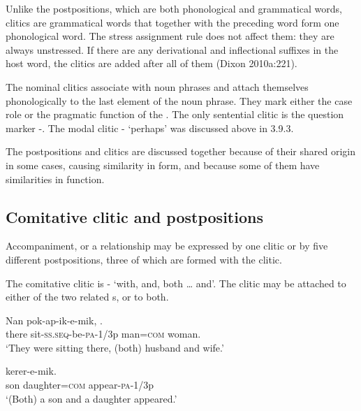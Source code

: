 Unlike the postpositions, which are both phonological and grammatical words, clitics are grammatical words that together with the preceding word form one phonological word. The stress assignment rule does not affect them: they are always unstressed. If there are any derivational and inflectional suffixes in the host word, the clitics are added after all of them (Dixon 2010a:221).

The nominal clitics associate with noun phrases and attach themselves phonologically to the last element of the noun phrase. They mark either the case role or the pragmatic function of the . The only sentential clitic is the question marker \nobreakdash-. The modal clitic - `perhaps' was discussed above in 3.9.3.

The postpositions and clitics are discussed together because of their shared origin in some cases, causing similarity in form, and because some of them have similarities in function.

\subsection{Comitative clitic and postpositions}\label{sec:3.12.1}
{}
Accompaniment, or a relationship may be expressed by one clitic or by five different postpositions, three of which are formed with the clitic. 

The comitative clitic is - `with, and, both {\dots} and'. The clitic may be attached to either of the two related s, or to both.

\ea%
\label{ex:3:x775}
\gll Nan pok-ap-ik-e-mik,  . \\
there sit-\textsc{ss}.\textsc{seq}-be-\textsc{pa}-1/3p man=\textsc{com} woman.\\
\glt`They were sitting there, (both) husband and wife.'
\z

\ea%
\label{ex:3:x776}
\gll {}  kerer-e-mik. \\
son daughter=\textsc{com} appear-\textsc{pa}-1/3p\\
\glt`(Both) a son and a daughter appeared.'
\z


